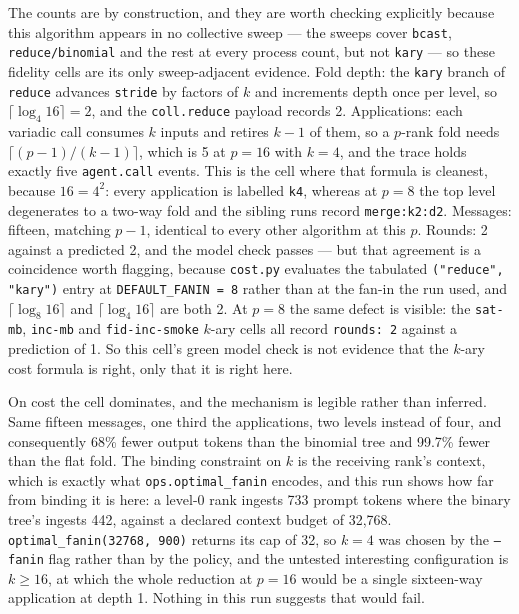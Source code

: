 \documentclass[11pt]{article}
\begin{document}
The counts are by construction, and they are worth checking explicitly because this
algorithm appears in no collective sweep --- the sweeps cover \texttt{bcast},
\texttt{reduce/binomial} and the rest at every process count, but not \texttt{kary} --- so
these fidelity cells are its only sweep-adjacent evidence. Fold depth: the \texttt{kary}
branch of \texttt{reduce} advances \texttt{stride} by factors of $k$ and increments depth
once per level, so $\lceil\log_4 16\rceil = 2$, and the \texttt{coll.reduce} payload records
2. Applications: each variadic call consumes $k$ inputs and retires $k-1$ of them, so a
$p$-rank fold needs $\lceil (p-1)/(k-1)\rceil$, which is 5 at $p=16$ with $k=4$, and the
trace holds exactly five \texttt{agent.call} events. This is the cell where that formula is
cleanest, because $16 = 4^2$: every application is labelled \texttt{k4}, whereas at $p=8$
the top level degenerates to a two-way fold and the sibling runs record
\texttt{merge:k2:d2}. Messages: fifteen, matching $p-1$, identical to every other algorithm
at this $p$. Rounds: 2 against a predicted 2, and the model check passes --- but that
agreement is a coincidence worth flagging, because \texttt{cost.py} evaluates the tabulated
\texttt{("reduce", "kary")} entry at \texttt{DEFAULT\_FANIN = 8} rather than at the fan-in
the run used, and $\lceil\log_8 16\rceil$ and $\lceil\log_4 16\rceil$ are both 2. At $p=8$
the same defect is visible: the \texttt{sat-mb}, \texttt{inc-mb} and \texttt{fid-inc-smoke}
$k$-ary cells all record \texttt{rounds: 2} against a prediction of 1. So this cell's green
model check is not evidence that the $k$-ary cost formula is right, only that it is right
here.

On cost the cell dominates, and the mechanism is legible rather than inferred. Same fifteen
messages, one third the applications, two levels instead of four, and consequently 68\%
fewer output tokens than the binomial tree and 99.7\% fewer than the flat fold. The binding
constraint on $k$ is the receiving rank's context, which is exactly what
\texttt{ops.optimal\_fanin} encodes, and this run shows how far from binding it is here: a
level-0 rank ingests 733 prompt tokens where the binary tree's ingests 442, against a
declared context budget of 32{,}768. \texttt{optimal\_fanin(32768, 900)} returns its cap of
32, so $k=4$ was chosen by the \texttt{--fanin} flag rather than by the policy, and the
untested interesting configuration is $k \ge 16$, at which the whole reduction at $p=16$
would be a single sixteen-way application at depth 1. Nothing in this run suggests that
would fail.
\end{document}
